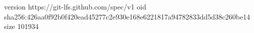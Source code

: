 version https://git-lfs.github.com/spec/v1
oid sha256:426aa0f92b0f420ead45277c2e930e168e6221817a94782833dd5d38c260be14
size 101934
